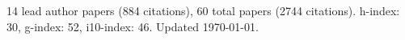 14 lead author papers (884 citations),
60 total papers (2744 citations).\newline
h-index: 30, g-index: 52, i10-index: 46. Updated \today.